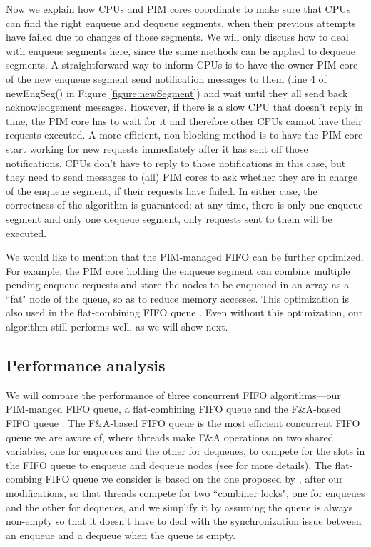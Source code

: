 \documentclass[11pt]{article}
\begin{document}
Now we explain how CPUs and PIM cores coordinate to make sure that CPUs can find the right enqueue 
and dequeue segments, when their previous attempts have failed due to changes of those segments. 
We will only discuss how to deal with enqueue segments here, 
since the same methods can be applied to dequeue segments. 
A straightforward way to inform CPUs is to have the owner PIM core of the new enqueue segment 
send notification messages to them (line 4 of newEngSeg() in Figure \ref{figure:newSegment}) 
and wait until they all send back acknowledgement messages. 
However, if there is a slow CPU that doesn't reply in time, 
the PIM core has to wait for it and therefore other CPUs cannot have their requests executed. 
A more efficient, non-blocking method is to have the PIM core start working for new requests 
immediately after it has sent off those notifications. 
CPUs don't have to reply to those notifications in this case, but they need to send messages 
to (all) PIM cores to ask whether they are in charge of the enqueue segment, 
if their requests have failed.
In either case, the correctness of the algorithm is guaranteed:  
at any time, there is only one enqueue segment and only one dequeue segment, 
only requests sent to them will be executed. 
  
We would like to mention that the PIM-managed FIFO can be further optimized. 
For example, the PIM core holding the enqueue segment can combine multiple pending enqueue requests 
and store the nodes to be enqueued in an array as a ``fat" node of the queue, 
so as to reduce memory accesses. 
This optimization is also used in the flat-combining FIFO queue \cite{Hendler10}. 
Even without this optimization, our algorithm still performs well, as we will show next. 

\subsection{Performance analysis}
We will compare the performance of three concurrent FIFO algorithms---our PIM-manged FIFO queue, 
a flat-combining FIFO queue and the F\&A-based FIFO queue \cite{Morrison13}. 
The F\&A-based FIFO queue is the most efficient concurrent FIFO queue we are aware of, 
where threads make F\&A operations on two shared variables, 
one for enqueues and the other for dequeues, to compete for the slots in the FIFO queue to 
enqueue and dequeue nodes (see \cite{Morrison13} for more details). 
The flat-combing FIFO queue we consider is based on the one proposed by \cite{Hendler10}, 
after our modifications, so that threads compete for two ``combiner locks", 
one for enqueues and the other for dequeues, 
and we simplify it by assuming the queue is always non-empty so that it doesn't have to deal with 
the synchronization issue between an enqueue and a dequeue when the queue is empty. 
\end{document}
